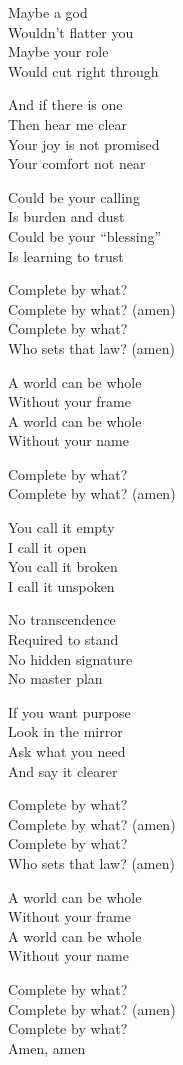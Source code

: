 \begin{lyrics}
Maybe a god\\
Wouldn’t flatter you\\
Maybe your role\\
Would cut right through

And if there is one\\
Then hear me clear\\
Your joy is not promised\\
Your comfort not near

Could be your calling\\
Is burden and dust\\
Could be your “blessing”\\
Is learning to trust

Complete by what?\\
Complete by what? (amen)\\
Complete by what?\\
Who sets that law? (amen)

A world can be whole\\
Without your frame\\
A world can be whole\\
Without your name

Complete by what?\\
Complete by what? (amen)

You call it empty\\
I call it open\\
You call it broken\\
I call it unspoken

No transcendence\\
Required to stand\\
No hidden signature\\
No master plan

If you want purpose\\
Look in the mirror\\
Ask what you need\\
And say it clearer

Complete by what?\\
Complete by what? (amen)\\
Complete by what?\\
Who sets that law? (amen)

A world can be whole\\
Without your frame\\
A world can be whole\\
Without your name

Complete by what?\\
Complete by what? (amen)\\
Complete by what?\\
Amen, amen
\end{lyrics}

